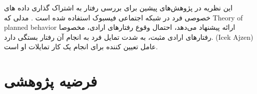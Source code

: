   این نظریه در پژوهش‌های پیشین برای بررسی رفتار
  به اشتراک گذاری داده های خصوصی
  فرد در شبکه اجتماعی فیسبوک استفاده شده است
  \!\citep{vanderschyffInformationPrivacyBehavior2020}
  \!.
  مدلی که
  \!\gls{Theory of planned behavior}
  ارائه پیشنهاد می‌دهد، احتمال وقوع  رفتار‌های ارادی، مخصوصا رفتار‌های ارادی مثبت، به شدت تمایل فرد به
  انجام آن رفتار بستگی دارد.
  \!({\gls{Icek Ajzen}})
  عامل تعیین کننده برای انجام یک کار تمایلات او است.
\fi



\section{فرضیه پژوهشی}



